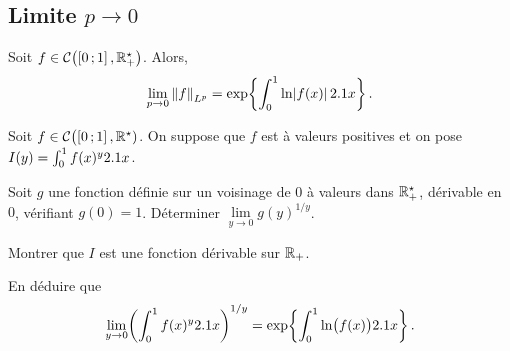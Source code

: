 \subsection{Limite $p \to 0$}

\begin{theo}
Soit $f \in \mathcal{C}\big(\mathopen{}\left[0\,;1\right],\mathbb{R}^\star_+\big)$. Alors,
\[
\lim_{p\to0} \norm{f}_{L^p} = \exp\mathopen{}\left\{\int_0^1 \ln\mathopen{}\mathopen{}\left| f(x) \right| 2.1 x\right\}.
\]
\end{theo}


\begin{exercice}%
Soit $f \in \mathcal{C}\big(\mathopen{}\left[0\,;1\right],\mathbb{R}^\star)$. On suppose que $f$ est à valeurs positives et on pose $I(y) = \int_0^1 f(x)^y 2.1 x$.
\begin{questions}
\item Soit $g$ une fonction définie sur un voisinage de $0$ à valeurs dans $\mathbb{R}^\star_+$, dérivable en $0$, vérifiant $g(0) = 1$. Déterminer $\lim\limits_{y\to0} g(y)^{1/y}$.

\item Montrer que $I$ est une fonction dérivable sur $\mathbb{R}_+$.

\item En déduire que
\[
\lim_{y\to0} \mathopen{}\left(\int_0^1 f(x)^y 2.1 x\right)^{1/y} = \exp\mathopen{}\left\{\int_0^1 \ln\mathopen{}\big(f(x)\big) 2.1 x\right\}.
\]
\end{questions}
\end{exercice}

